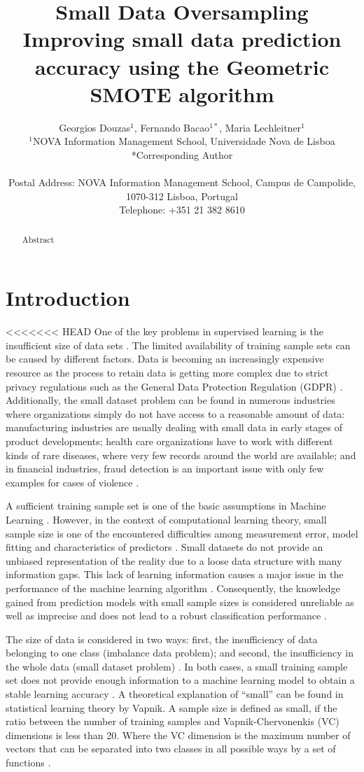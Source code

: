\documentclass[parskip=full]{scrartcl}
\title{Small Data Oversampling  \\ \LARGE{Improving small data prediction accuracy using the Geometric SMOTE algorithm}}
\author{
	Georgios Douzas\(^{1}\), Fernando Bacao\(^{1*}\), Maria Lechleitner\(^{1}\) 
	\\
	\small{\(^{1}\)NOVA Information Management School, Universidade Nova de Lisboa}
	\\
	\small{*Corresponding Author}
	\\
	\\
	\small{Postal Address: NOVA Information Management School, Campus de Campolide, 1070-312 Lisboa, Portugal}
	\\
	\small{Telephone: +351 21 382 8610}
}
\date{}
\begin{document}
\maketitle

\begin{abstract}
Abstract
\end{abstract}

\section{Introduction}
<<<<<<< HEAD
One of the key problems in supervised learning is the insufficient size of data sets \cite{Niyogi.1998}. The limited availability of training sample sets can be caused by different factors. Data is becoming an increasingly expensive resource \cite{Li.2007} as the process to retain data is getting more complex due to strict privacy regulations such as the General Data Protection Regulation (GDPR) \cite{EuropeanCommission.2019}. Additionally, the small dataset problem can be found in numerous industries where organizations simply do not have access to a reasonable amount of data: manufacturing industries are usually dealing with small data in early stages of product developments; health care organizations have to work with different kinds of rare diseases, where very few records around the world are available; and in financial industries, fraud detection is an important issue with only few examples for cases of violence \cite{AbdulLateh.2017}.

A sufficient training sample set is one of the basic assumptions in Machine Learning \cite{Ivanescu.2006}. However, in the context of computational learning theory, small sample size is one of the encountered difficulties among measurement error, model fitting and characteristics of predictors \cite{AbdulLateh.2017}. Small datasets do not provide an unbiased representation of the reality due to a loose data structure with many information gaps. This lack of learning information causes a major issue in the performance of the machine learning algorithm \cite{Lin.2018}. Consequently, the knowledge gained from prediction models with small sample sizes is considered unreliable as well as imprecise and does not lead to a robust classification performance \cite{AbdulLateh.2017}.

The size of data is considered in two ways: first, the insufficiency of data belonging to one class (imbalance data problem); and second, the insufficiency in the whole data (small dataset problem) \cite{Sezer.2014}. In both cases, a small training sample set does not provide enough information to a machine learning model to obtain a stable learning accuracy \cite{Tsai.2008}. A theoretical explanation of “small” can be found in statistical learning theory by Vapnik. A sample size is defined as small, if the ratio between the number of training samples and Vapnik-Chervonenkis (VC) dimensions is less than 20. Where the VC dimension is the maximum number of vectors that can be separated into two classes in all possible ways by a set of functions \cite{Vapnik.2008}. 
\end{document}
